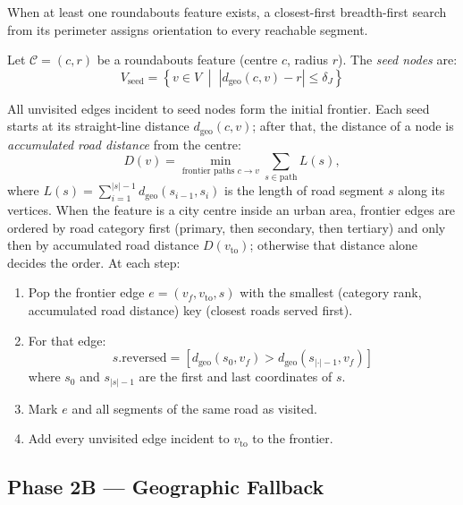 \documentclass[12pt,a4paper]{article}
\theoremstyle{definition}
\theoremstyle{plain}
\theoremstyle{remark}
\newcommand{\abs}[1]{\left\lvert #1 \right\rvert}
\begin{document}
When at least one roundabouts feature exists, a closest-first breadth-first
search from its perimeter assigns orientation to every reachable segment.

Let $\mathcal{C} = (c, r)$ be a roundabouts feature (centre $c$, radius $r$).
The \emph{seed nodes} are:
\begin{equation}
  V_{\text{seed}} = \left\{ v \in V \;\middle|\;
    \abs{d_{\text{geo}}(c, v) - r} \leq \delta_J
  \right\}
  \label{eq:seed_nodes}
\end{equation}

All unvisited edges incident to seed nodes form the initial frontier. Each
seed starts at its straight-line distance $d_{\text{geo}}(c, v)$; after that,
the distance of a node is \emph{accumulated road distance} from the centre:
\begin{equation}
  D(v) = \min_{\text{frontier paths } c \to v} \sum_{s \in \text{path}} L(s),
  \label{eq:road_distance}
\end{equation}
where $L(s) = \sum_{i=1}^{\abs{s}-1} d_{\text{geo}}(s_{i-1}, s_i)$ is the length
of road segment $s$ along its vertices. When the feature is a city centre
inside an urban area, frontier edges are ordered by road category first
(primary, then secondary, then tertiary) and only then by accumulated road
distance $D(v_{\text{to}})$; otherwise that distance alone decides the order.
At each step:
\begin{enumerate}
  \item Pop the frontier edge $e = (v_f, v_{\text{to}}, s)$ with the smallest
    (category rank, accumulated road distance) key (closest roads served first).
  \item For that edge:
    \begin{equation}
      s.\mathrm{reversed} = \left[
        d_{\text{geo}}(s_0, v_f) > d_{\text{geo}}(s_{|\cdot|-1}, v_f)
      \right]
      \label{eq:segment_orient}
    \end{equation}
    where $s_0$ and $s_{|s|-1}$ are the first and last coordinates of $s$.
  \item Mark $e$ and all segments of the same road as visited.
  \item Add every unvisited edge incident to $v_{\text{to}}$ to the frontier.
\end{enumerate}

\subsection{Phase 2B — Geographic Fallback}
\end{document}
